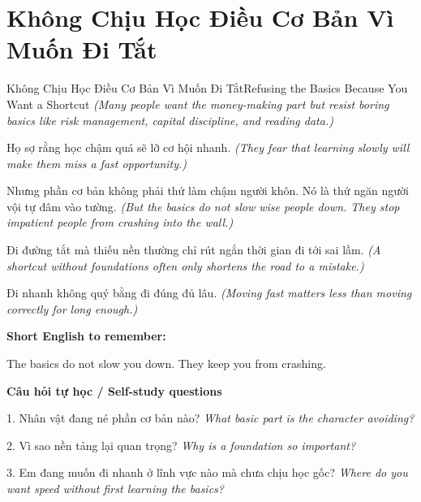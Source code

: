 \section{Không Chịu Học Điều Cơ Bản Vì Muốn Đi Tắt}
\begin{truyen}{Không Chịu Học Điều Cơ Bản Vì Muốn Đi Tắt}{Refusing the Basics Because You Want a Shortcut}
\textit{(Many people want the money-making part but resist boring basics like risk management, capital discipline, and reading data.)}

Họ sợ rằng học chậm quá sẽ lỡ cơ hội nhanh.
\textit{(They fear that learning slowly will make them miss a fast opportunity.)}

Nhưng phần cơ bản không phải thứ làm chậm người khôn. Nó là thứ ngăn người vội tự đâm vào tường.
\textit{(But the basics do not slow wise people down. They stop impatient people from crashing into the wall.)}

Đi đường tắt mà thiếu nền thường chỉ rút ngắn thời gian đi tới sai lầm.
\textit{(A shortcut without foundations often only shortens the road to a mistake.)}

\end{truyen}

\begin{baihoc}
Đi nhanh không quý bằng đi đúng đủ lâu.
\textit{(Moving fast matters less than moving correctly for long enough.)}
\end{baihoc}

\begin{ghinhoanh}
\textbf{Short English to remember:}

The basics do not slow you down. They keep you from crashing.

\end{ghinhoanh}

\begin{tuhocnhanh}
\textbf{Câu hỏi tự học / Self-study questions}

1. Nhân vật đang né phần cơ bản nào? \textit{What basic part is the character avoiding?}

2. Vì sao nền tảng lại quan trọng? \textit{Why is a foundation so important?}

3. Em đang muốn đi nhanh ở lĩnh vực nào mà chưa chịu học gốc? \textit{Where do you want speed without first learning the basics?}
\end{tuhocnhanh}
\ngancach

